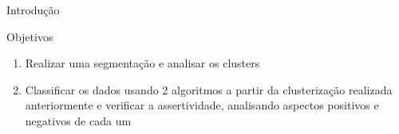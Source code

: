 \documentclass[final,hyperref={pdfpagelabels=false, brazil}]{beamer}
\begin{document}
\begin{frame}[t]
\begin{columns}[t]
\begin{column}{.465\textwidth}
\begin{block}{Introdu\c c\~ao}
\end{block}



\begin{block}{Objetivos}

\begin{enumerate}
\item Realizar uma segmentação e analisar os clusters 
\item Classificar os dados usando 2 algoritmos a partir da clusterização realizada anteriormente e verificar a assertividade, analisando aspectos positivos e negativos de cada um
\end{enumerate}


\end{block}







\end{column}
\end{columns}
\end{frame}
\end{document}
